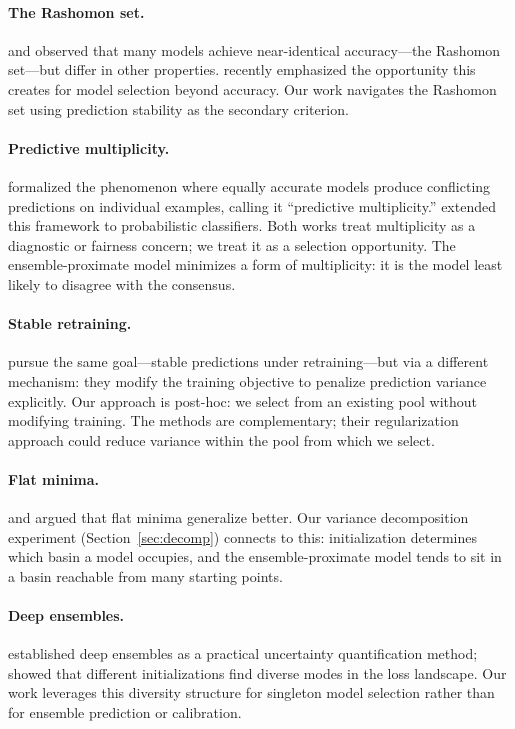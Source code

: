 \documentclass[11pt]{article}
\begin{document}
\paragraph{The Rashomon set.}
\citet{breiman2001statistical} and \citet{fisher2019models} observed that many models achieve near-identical accuracy---the Rashomon set---but differ in other properties.
\citet{rudin2024amazing} recently emphasized the opportunity this creates for model selection beyond accuracy.
Our work navigates the Rashomon set using prediction stability as the secondary criterion.

\paragraph{Predictive multiplicity.}
\citet{marx2020predictive} formalized the phenomenon where equally accurate models produce conflicting predictions on individual examples, calling it ``predictive multiplicity.''
\citet{watson2023predictive} extended this framework to probabilistic classifiers.
Both works treat multiplicity as a diagnostic or fairness concern; we treat it as a selection opportunity.
The ensemble-proximate model minimizes a form of multiplicity: it is the model least likely to disagree with the consensus.

\paragraph{Stable retraining.}
\citet{milani2024stable} pursue the same goal---stable predictions under retraining---but via a different mechanism: they modify the training objective to penalize prediction variance explicitly.
Our approach is post-hoc: we select from an existing pool without modifying training.
The methods are complementary; their regularization approach could reduce variance within the pool from which we select.

\paragraph{Flat minima.}
\citet{hochreiter1997flat} and \citet{foret2021sharpness} argued that flat minima generalize better.
Our variance decomposition experiment (Section~\ref{sec:decomp}) connects to this: initialization determines which basin a model occupies, and the ensemble-proximate model tends to sit in a basin reachable from many starting points.

\paragraph{Deep ensembles.}
\citet{lakshminarayanan2017simple} established deep ensembles as a practical uncertainty quantification method; \citet{fort2020deep} showed that different initializations find diverse modes in the loss landscape.
Our work leverages this diversity structure for singleton model selection rather than for ensemble prediction or calibration.
\end{document}
